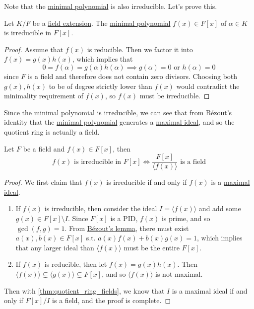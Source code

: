   Note that the \hyperref[def:min_poly]{minimal polynomial} is also irreducible. Let's prove this. 

  \begin{lemma}
    \label{thm:minimal-polynomial-is-irreducible}
    Let $K/F$ be a \hyperref[def:field-extension]{field extension}. The \hyperref[def:min_poly]{minimal polynomial} $f(x) \in F[x]$ of $\alpha \in K$ is irreducible in $F[x]$. 
  \end{lemma}
  \begin{proof}
    Assume that $f(x)$ is reducible. Then we factor it into $f(x) = g(x) h(x)$, which implies that 
    \begin{equation}
      0 = f(\alpha) = g(\alpha) h(\alpha) \implies g(\alpha) = 0 \text{ or } h(\alpha) = 0
    \end{equation}
    since $F$ is a field and therefore does not contain zero divisors. Choosing both $g(x), h(x)$ to be of degree strictly lower than $f(x)$ would contradict the minimality requirement of $f(x)$, so $f(x)$ must be irreducible. 
  \end{proof}

  Since the \hyperref[thm:minimal-polynomial-is-irreducible]{minimal polynomial is irreducible}, we can see that from Bézout's identity that the \hyperref[def:min_poly]{minimal polynomial} generates a \hyperref[def:maximal-ideal]{maximal ideal}, and so the quotient ring is actually a field. 

  \begin{theorem}
    \label{thm:quotient-ring-of-minimal-polynomial-is-a-field}
    Let $F$ be a field and $f(x) \in F[x]$, then 
    \begin{equation}
      f(x) \text{ is irreducible in } F[x] \iff \frac{F[x]}{\langle f(x) \rangle} \text{ is a field}
    \end{equation} 
  \end{theorem}
  \begin{proof}
    We first claim that $f(x)$ is irreducible if and only if $f(x)$ is a \hyperref[def:maximal-ideal]{maximal ideal}.  
    \begin{enumerate}
      \item If $f(x)$ is irreducible, then consider the ideal $I = \langle f(x) \rangle$ and add some $g(x) \in F[x] \setminus I$. Since $F[x]$ is a PID, $f(x)$ is prime, and so $\gcd(f, g) = 1$. From \hyperref[thm:bezouts-lemma-in-pids]{Bézout's lemma}, there must exist $a(x), b(x) \in F[x]$ s.t. $a(x) f(x) + b(x) g(x) = 1$, which implies that any larger ideal than $\langle f(x) \rangle$ must be the entire $F[x]$. 

      \item If $f(x)$ is reducible, then let $f(x) = g(x) h(x)$. Then $\langle f(x) \rangle \subsetneq \langle g(x) \rangle \subsetneq F[x]$, and so $\langle f(x) \rangle$ is not maximal. 
    \end{enumerate}
    Then with \ref{thm:quotient_ring_fields}, we know that $I$ is a maximal ideal if and only if $F[x]/I$ is a field, and the proof is complete. 
  \end{proof}

